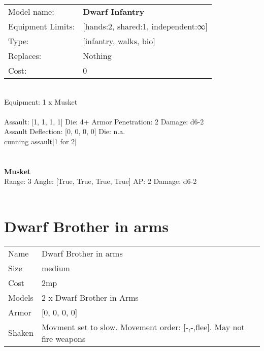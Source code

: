 \noindent
\begin{tabular}{ll}
Model name: &{\bf Dwarf Infantry } \\
Equipment Limits: &[hands:2, shared:1, independent:∞] \\
Type: &[infantry, walks, bio] \\
Replaces: &Nothing \\
Cost: & 0\\
\end{tabular}
\ \\
Equipment: 1 x Musket \\
\ \\
Assault: [1, 1, 1, 1] Die: 4+ Armor Penetration: 2 Damage: d6-2 \\
Assault Deflection: [0, 0, 0, 0] Die: n.a.\\
\indent cunning assault[1 for 2]\\ 
 
\ \\

\ \\
{\bf Musket } \\



Range: 3  Angle: [True, True, True, True] AP: 2 Damage: d6-2 \\




 
\ \\













\clearpage

\section{ Dwarf Brother in arms }

\begin{tabular}{ll}
  Name & Dwarf Brother in arms \\
  Size & medium\\
  Cost & 2mp\\
  Models & 2 x Dwarf Brother in Arms\\
  Armor & [0, 0, 0, 0]\\
  Shaken & Movment set to slow. Movement order: [-,-,flee]. May not fire weapons\\
\end{tabular}

